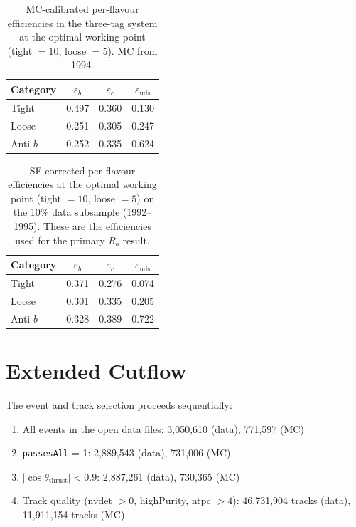 \documentclass[11pt,a4paper]{article}
\begin{document}
\begin{table}[htbp]
\centering
\caption{MC-calibrated per-flavour efficiencies in the three-tag
system at the optimal working point (tight $= 10$, loose $= 5$).
MC from 1994.}
\label{tbl:efficiencies}
\begin{tabular}{lccc}
\toprule
Category & $\varepsilon_b$ & $\varepsilon_c$ &
  $\varepsilon_\text{uds}$ \\
\midrule
Tight & 0.497 & 0.360 & 0.130 \\
Loose & 0.251 & 0.305 & 0.247 \\
Anti-$b$ & 0.252 & 0.335 & 0.624 \\
\bottomrule
\end{tabular}
\end{table}

\begin{table}[htbp]
\centering
\caption{SF-corrected per-flavour efficiencies at the optimal
working point (tight $= 10$, loose $= 5$) on the 10\% data
subsample (1992--1995). These are the efficiencies used for the
primary $R_b$ result.}
\label{tbl:efficiencies_sf}
\begin{tabular}{lccc}
\toprule
Category & $\varepsilon_b$ & $\varepsilon_c$ &
  $\varepsilon_\text{uds}$ \\
\midrule
Tight & 0.371 & 0.276 & 0.074 \\
Loose & 0.301 & 0.335 & 0.205 \\
Anti-$b$ & 0.328 & 0.389 & 0.722 \\
\bottomrule
\end{tabular}
\end{table}

\section{Extended Cutflow}
\label{app:cutflow}

The event and track selection proceeds sequentially:
\begin{enumerate}
\item All events in the open data files: 3,050,610 (data),
  771,597 (MC)
\item \texttt{passesAll} = 1: 2,889,543 (data), 731,006 (MC)
\item $|\cos\theta_\text{thrust}| < 0.9$: 2,887,261 (data),
  730,365 (MC)
\item Track quality (nvdet $> 0$, highPurity, ntpc $> 4$):
  46,731,904 tracks (data), 11,911,154 tracks (MC)
\end{enumerate}
\end{document}
